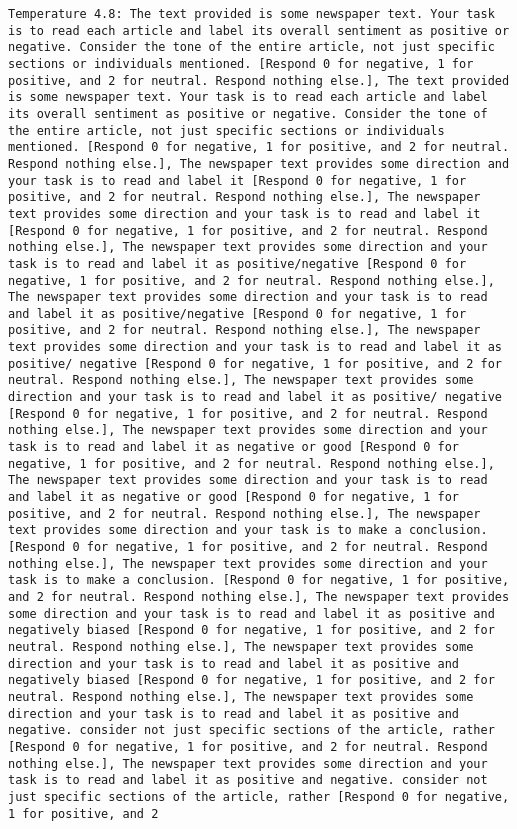 \begin{lstlisting}[label=lst:poor_performing_prompts]
	Temperature 4.8: The text provided is some newspaper text. Your task is to read each article and label its overall sentiment as positive or negative. Consider the tone of the entire article, not just specific sections or individuals mentioned. [Respond 0 for negative, 1 for positive, and 2 for neutral. Respond nothing else.], The text provided is some newspaper text. Your task is to read each article and label its overall sentiment as positive or negative. Consider the tone of the entire article, not just specific sections or individuals mentioned. [Respond 0 for negative, 1 for positive, and 2 for neutral. Respond nothing else.], The newspaper text provides some direction and your task is to read and label it [Respond 0 for negative, 1 for positive, and 2 for neutral. Respond nothing else.], The newspaper text provides some direction and your task is to read and label it [Respond 0 for negative, 1 for positive, and 2 for neutral. Respond nothing else.], The newspaper text provides some direction and your task is to read and label it as positive/negative [Respond 0 for negative, 1 for positive, and 2 for neutral. Respond nothing else.], The newspaper text provides some direction and your task is to read and label it as positive/negative [Respond 0 for negative, 1 for positive, and 2 for neutral. Respond nothing else.], The newspaper text provides some direction and your task is to read and label it as positive/ negative [Respond 0 for negative, 1 for positive, and 2 for neutral. Respond nothing else.], The newspaper text provides some direction and your task is to read and label it as positive/ negative [Respond 0 for negative, 1 for positive, and 2 for neutral. Respond nothing else.], The newspaper text provides some direction and your task is to read and label it as negative or good [Respond 0 for negative, 1 for positive, and 2 for neutral. Respond nothing else.], The newspaper text provides some direction and your task is to read and label it as negative or good [Respond 0 for negative, 1 for positive, and 2 for neutral. Respond nothing else.], The newspaper text provides some direction and your task is to make a conclusion. [Respond 0 for negative, 1 for positive, and 2 for neutral. Respond nothing else.], The newspaper text provides some direction and your task is to make a conclusion. [Respond 0 for negative, 1 for positive, and 2 for neutral. Respond nothing else.], The newspaper text provides some direction and your task is to read and label it as positive and negatively biased [Respond 0 for negative, 1 for positive, and 2 for neutral. Respond nothing else.], The newspaper text provides some direction and your task is to read and label it as positive and negatively biased [Respond 0 for negative, 1 for positive, and 2 for neutral. Respond nothing else.], The newspaper text provides some direction and your task is to read and label it as positive and negative. consider not just specific sections of the article, rather [Respond 0 for negative, 1 for positive, and 2 for neutral. Respond nothing else.], The newspaper text provides some direction and your task is to read and label it as positive and negative. consider not just specific sections of the article, rather [Respond 0 for negative, 1 for positive, and 2 
\end{lstlisting}
